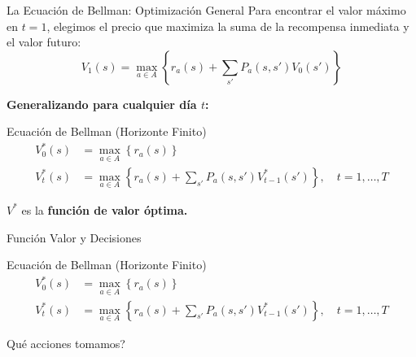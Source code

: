 \documentclass[xcolor=dvipsnames]{beamer}
\begin{document}
\begin{frame}{La Ecuaci\'on de Bellman: Optimizaci\'on General}
Para encontrar el valor m\'aximo en $t=1$, elegimos el precio que maximiza la suma de la recompensa inmediata y el valor futuro:
$$
V_1(s) = \max_{a \in A} \left\{ r_a(s) + \sum_{s'} P_a(s,s')V_0(s') \right\} 
$$

\textbf{Generalizando para cualquier d\'ia $t$:}

\begin{alertblock}{Ecuaci\'on de Bellman (Horizonte Finito)}
\[
\begin{aligned}
V^*_0(s) &=\max_{a \in A} \left\{ r_a(s) \right\}\\
V^*_t(s) &= \max_{a \in A} \left\{ r_a(s) + \sum_{s'} P_a(s,s')V^*_{t-1}(s') \right\}, \quad t = 1,\dots,T
\end{aligned}
\]
\end{alertblock}
$V^*$ es la \textbf{funci\'on de valor \'optima.}
\end{frame}

\begin{frame}{Funci\'on Valor y Decisiones}
\begin{alertblock}{Ecuaci\'on de Bellman (Horizonte Finito)}
\[
\begin{aligned}
V^*_0(s) &=\max_{a \in A} \left\{ r_a(s) \right\}\\
V^*_t(s) &= \max_{a \in A} \left\{ r_a(s) + \sum_{s'} P_a(s,s')V^*_{t-1}(s') \right\}, \quad t = 1,\dots,T
\end{aligned}
\]
\end{alertblock}

\begin{alertblock}{\textquestiondown Qu\'e acciones tomamos?}
\end{alertblock}
\end{frame}
\end{document}
